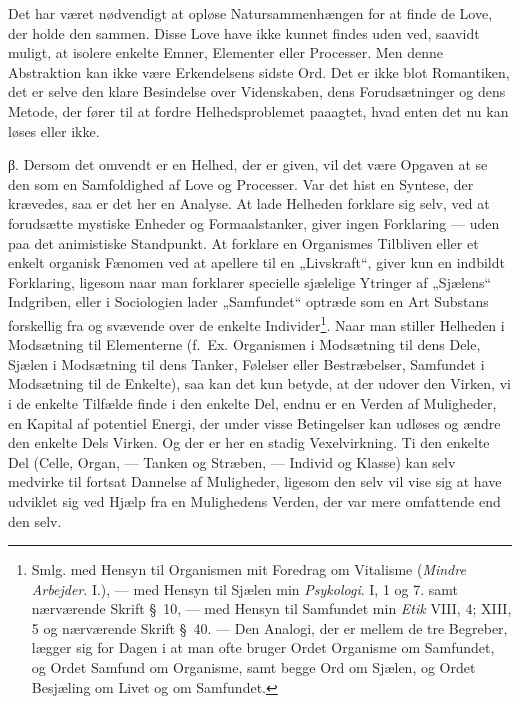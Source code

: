 \documentclass[12pt,a4paper]{book}
\newcommand{\apage}[1]{\marginnote{\footnotesize\textit{[#1]}}}
\begin{document}
Det har været nødvendigt at opløse Natursammenhængen for at finde de Love, der holde
den sammen. Disse Love have ikke kunnet findes uden ved, saavidt muligt, at isolere
enkelte Emner, Elementer eller Processer. Men denne Abstraktion kan ikke være
Erkendelsens sidste Ord. Det er ikke blot Romantiken, det er selve den klare
Besindelse over Videnskaben, dens Forudsætninger og dens Metode, der fører til at
fordre Helhedsproblemet paaagtet, hvad enten det nu kan løses eller ikke.

β. Dersom det omvendt er en Helhed, der er given, vil det være Opgaven at se den som
en Samfoldighed af Love og Processer. Var det hist en Syntese, der krævedes, saa er
det her en Analyse. At lade Helheden forklare sig selv, ved at forudsætte mystiske
Enheder og Formaalstanker, giver ingen Forklaring --- uden paa det animistiske
Standpunkt. At forklare en Organismes Tilbliven eller et enkelt organisk Fænomen ved at apellere til en „Livskraft“, giver kun en indbildt Forklaring, ligesom naar man
forklarer specielle sjælelige Ytringer af „Sjælens“ Indgriben, eller i Sociologien
lader „Samfundet“ optræde som en Art Substans forskellig fra og svævende over de
enkelte Individer\footnote{Smlg. med Hensyn til Organismen mit Foredrag om Vitalisme
(\emph{Mindre Arbejder}. I.), --- med Hensyn til Sjælen min \emph{Psykologi}. I, 1 og
7. samt nærværende Skrift \S\ 10, --- med Hensyn til Samfundet min \emph{Etik} VIII,
4; XIII, 5 og nærværende Skrift \S\ 40. --- Den Analogi, der er mellem de tre
Begreber, lægger sig for Dagen i at man ofte bruger Ordet Organisme om Samfundet, og
Ordet Samfund om Organisme, samt begge Ord om Sjælen, og Ordet Besjæling om Livet og
om Samfundet.}. Naar \apage{290} man stiller Helheden i Modsætning til Elementerne (f.\ Ex.
Organismen i Modsætning til dens Dele, Sjælen i Modsætning til dens Tanker, Følelser
eller Bestræbelser, Samfundet i Modsætning til de Enkelte), saa kan det kun betyde,
at der udover den Virken, vi i de enkelte Tilfælde finde i den enkelte Del, endnu er
en Verden af Muligheder, en Kapital af potentiel Energi, der under visse Betingelser
kan udløses og ændre den enkelte Dels Virken. Og der er her en stadig Vexelvirkning.
Ti den enkelte Del (Celle, Organ, --- Tanken og Stræben, --- Individ og Klasse) kan
selv medvirke til fortsat Dannelse af Muligheder, ligesom den selv vil vise sig at
have udviklet sig ved Hjælp fra en Mulighedens Verden, der var mere omfattende end
den selv.
\end{document}
